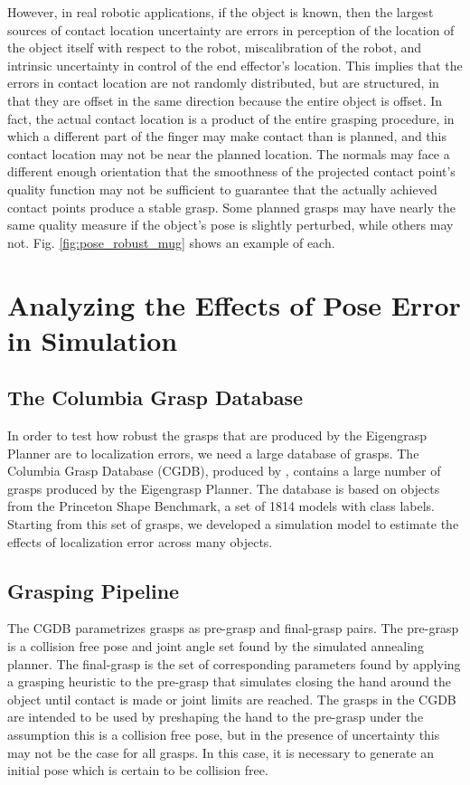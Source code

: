 However, in real robotic applications, if the object is known, then the largest sources of contact location uncertainty are errors in perception of the location of the object itself with respect to the robot, miscalibration of the robot, and intrinsic uncertainty in control of the end effector's location. This implies that the errors in contact location are not randomly distributed, but are structured, in that they are offset in the same direction because the entire object is offset. In fact, the actual contact location is a product of the entire grasping procedure, in which a different part of the finger may make contact than is planned, and this contact location may not be near the planned location. The normals may face a different enough orientation that the smoothness of the projected contact point's quality function may not be sufficient to guarantee that the actually achieved contact points produce a stable grasp. Some planned grasps may have nearly the same quality measure if the object's pose is slightly perturbed, while others may not. Fig. \ref{fig:pose_robust_mug} shows an example of each. 


\section{Analyzing the Effects of Pose Error in Simulation}
\label{sec:PoseErrorSim}
\subsection{The Columbia Grasp Database}
In order to test how robust the grasps that are produced by the Eigengrasp Planner are to localization errors, we need a large database of grasps. The Columbia Grasp Database (CGDB), produced by \cite{GoldfederCGDB}, contains a large number of grasps produced by the Eigengrasp Planner. The database is based on objects from the Princeton Shape Benchmark, a set of 1814 models with class labels. Starting from this set of grasps, we developed a simulation model to estimate the effects of localization error across many objects. 

\subsection{Grasping Pipeline}
\label{sec:GraspingPipeline}
The CGDB parametrizes grasps as pre-grasp and final-grasp pairs.  The pre-grasp is a collision free pose and joint angle set found by the simulated annealing planner.  The final-grasp is the set of corresponding parameters found by applying a grasping heuristic to the pre-grasp that simulates closing the hand around the object until contact is made or joint limits are reached.
The grasps in the CGDB are intended to be used by preshaping the hand to the pre-grasp under the assumption this is a collision free pose, but in the presence of uncertainty this may not be the case for all grasps.  In this case, it is necessary to generate an initial pose which is certain to be collision free.  

